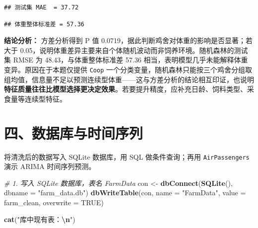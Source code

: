 \documentclass[
]{ctexart}
\newenvironment{Shaded}{\begin{snugshade}}{\end{snugshade}}
\newcommand{\AttributeTok}[1]{\textcolor[rgb]{0.13,0.29,0.53}{#1}}
\newcommand{\CommentTok}[1]{\textcolor[rgb]{0.56,0.35,0.01}{\textit{#1}}}
\newcommand{\ConstantTok}[1]{\textcolor[rgb]{0.56,0.35,0.01}{#1}}
\newcommand{\DecValTok}[1]{\textcolor[rgb]{0.00,0.00,0.81}{#1}}
\newcommand{\FunctionTok}[1]{\textcolor[rgb]{0.13,0.29,0.53}{\textbf{#1}}}
\newcommand{\NormalTok}[1]{#1}
\newcommand{\OtherTok}[1]{\textcolor[rgb]{0.56,0.35,0.01}{#1}}
\newcommand{\SpecialCharTok}[1]{\textcolor[rgb]{0.81,0.36,0.00}{\textbf{#1}}}
\newcommand{\StringTok}[1]{\textcolor[rgb]{0.31,0.60,0.02}{#1}}
\begin{document}
\begin{verbatim}
## 测试集 MAE  = 37.72
\end{verbatim}

\begin{Shaded}
\end{Shaded}

\begin{verbatim}
## 体重整体标准差 = 57.36
\end{verbatim}

\textbf{结论分析：} 方差分析得到 P 值
0.0719，据此判断鸡舍对体重的影响是否显著；若大于
0.05，说明体重差异主要来自个体随机波动而非饲养环境。随机森林的测试集
RMSE 为 48.43，与体重整体标准差 57.36
相当，表明模型几乎未能解释体重变异。原因在于本题仅提供 \texttt{Coop}
一个分类变量，随机森林只能按三个鸡舍分组取组均值，信息量不足以预测连续型体重------这与方差分析的结论相互印证，也说明\textbf{特征质量往往比模型选择更决定效果}。若要提升精度，应补充日龄、饲料类型、采食量等连续型特征。

\section{四、数据库与时间序列}\label{ux56dbux6570ux636eux5e93ux4e0eux65f6ux95f4ux5e8fux5217}

将清洗后的数据写入 SQLite 数据库，用 SQL 做条件查询；再用
\texttt{AirPassengers} 演示 ARIMA 时间序列预测。

\begin{Shaded}
\begin{Highlighting}[]
\CommentTok{\# 1. 写入 SQLite 数据库，表名 FarmData}
\NormalTok{con }\OtherTok{\textless{}{-}} \FunctionTok{dbConnect}\NormalTok{(}\FunctionTok{SQLite}\NormalTok{(), }\AttributeTok{dbname =} \StringTok{"farm\_data.db"}\NormalTok{)}
\FunctionTok{dbWriteTable}\NormalTok{(con, }\AttributeTok{name =} \StringTok{"FarmData"}\NormalTok{, }\AttributeTok{value =}\NormalTok{ farm\_clean, }\AttributeTok{overwrite =} \ConstantTok{TRUE}\NormalTok{)}

\FunctionTok{cat}\NormalTok{(}\StringTok{"库中现有表：}\SpecialCharTok{\textbackslash{}n}\StringTok{"}\NormalTok{)}
\end{Highlighting}
\end{Shaded}
\end{document}
